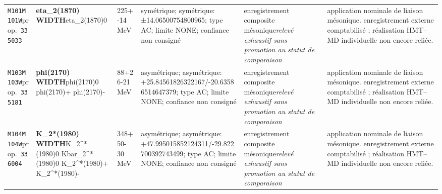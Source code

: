 \begin{landscape}
\begin{longtable}{L{1.85cm}L{4.45cm}L{2.35cm}L{4.05cm}L{3.35cm}L{7.15cm}}
\texttt{M101}\newline \texttt{M101W}\newline prop.\ \texttt{335033} & \textbf{eta\_\allowbreak{}2(1870) WIDTH}\newline eta\_\allowbreak{}2(1870)0 & 225+-14\,MeV & symétrique; symétrique: ±14.06500754800965; type AC; limite NONE; confiance non consigné & enregistrement composite mésonique\newline \emph{relevé exhaustif sans promotion au statut de comparaison} & application nominale de liaison mésonique. enregistrement externe comptabilisé ; réalisation HMT--MD individuelle non encore reliée. \\
\texttt{M103}\newline \texttt{M103W}\newline prop.\ \texttt{335181} & \textbf{phi(2170) WIDTH}\newline phi(2170)0 \textbar{}\allowbreak{} phi(2170)+ \textbar{}\allowbreak{} phi(2170)- & 88+26-21\,MeV & asymétrique; asymétrique: +25.84561826322167/-20.63586514647379; type AC; limite NONE; confiance non consigné & enregistrement composite mésonique\newline \emph{relevé exhaustif sans promotion au statut de comparaison} & application nominale de liaison mésonique. enregistrement externe comptabilisé ; réalisation HMT--MD individuelle non encore reliée. \\
\texttt{M104}\newline \texttt{M104W}\newline prop.\ \texttt{336004} & \textbf{K\_\allowbreak{}2*(1980) WIDTH}\newline K\_\allowbreak{}2\textasciicircum{}*(1980)0 \textbar{}\allowbreak{} Kbar\_\allowbreak{}2\textasciicircum{}*(1980)0 \textbar{}\allowbreak{} K\_\allowbreak{}2\textasciicircum{}*(1980)+ \textbar{}\allowbreak{} K\_\allowbreak{}2\textasciicircum{}*(1980)- & 348+50-30\,MeV & asymétrique; asymétrique: +47.995015852124311/-29.822700392743499; type AC; limite NONE; confiance non consigné & enregistrement composite mésonique\newline \emph{relevé exhaustif sans promotion au statut de comparaison} & application nominale de liaison mésonique. enregistrement externe comptabilisé ; réalisation HMT--MD individuelle non encore reliée. \\

\end{longtable}
\end{landscape}
